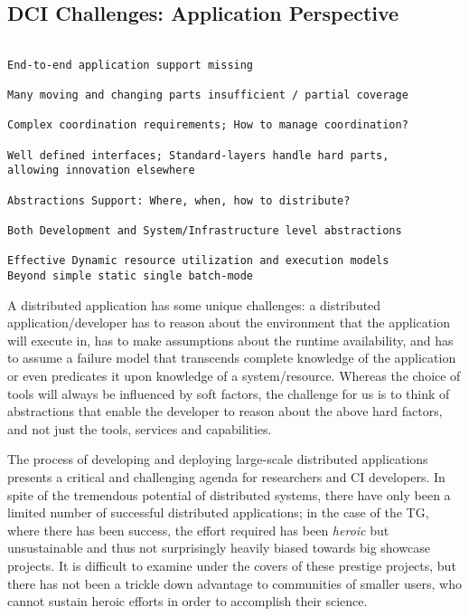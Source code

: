 \documentclass[a4paper,12pt]{article}
\begin{document}
\subsection{DCI Challenges: Application Perspective}

\begin{verbatim}

End-to-end application support missing

Many moving and changing parts insufficient / partial coverage

Complex coordination requirements; How to manage coordination?

Well defined interfaces; Standard-layers handle hard parts, 
allowing innovation elsewhere

Abstractions Support: Where, when, how to distribute? 

Both Development and System/Infrastructure level abstractions

Effective Dynamic resource utilization and execution models
Beyond simple static single batch-mode

\end{verbatim}

 A distributed application has some unique challenges: a distributed
 application/developer has to reason about the environment that the
 application will execute in, has to make assumptions about the
 runtime availability, and has to assume a failure model that
 transcends complete knowledge of the application or even predicates
 it upon knowledge of a system/resource.  Whereas the choice of tools
 will always be influenced by soft factors, the challenge for us is to
 think of abstractions that enable the developer to reason about the
 above hard factors, and not just the tools, services and
 capabilities.

 The process of developing and deploying large-scale distributed
 applications presents a critical and challenging agenda for
 researchers and CI developers.  In spite of the tremendous potential
 of distributed systems, there have only been a limited number of
 successful distributed applications; in the case of the TG, where
 there has been success, the effort required has been {\it heroic} but
 unsustainable and thus not surprisingly heavily biased towards big
 showcase projects. It is difficult to examine under the covers of
 these prestige projects, but there has not been a trickle down
 advantage to communities of smaller users, who cannot sustain heroic
 efforts in order to accomplish their science.
\end{document}
